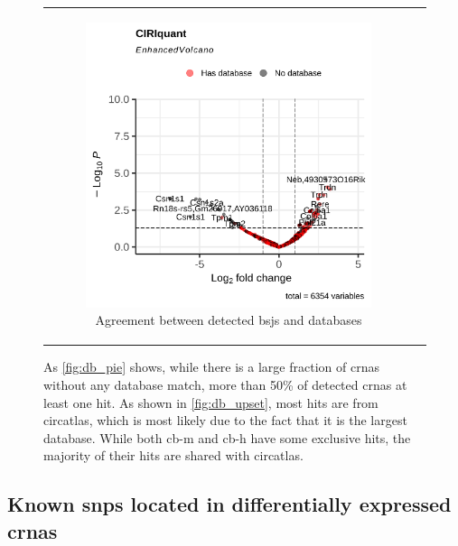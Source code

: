 \begin{figure}[ht]
\begin{tabular}{cc}
\begin{subfigure}{0.5\textwidth}
            \includegraphics[width=\linewidth]{chapters/4_results_and_discussion/figures/dea/ciriquant/letrozole/volcano.png}
            \caption{Agreement between detected
                \glspl{bsj} and databases}
            \label{fig:letrozole_volcano_ciriquant}
        \end{subfigure} &

    \end{tabular}
    \caption{As \cref{fig:db_pie} shows, while there is a large fraction of
        \glspl{crna} without any
        database match, more than 50\% of detected \glspl{crna} at least one
        hit.
        As shown in \cref{fig:db_upset}, most hits are from \gls{circatlas}, which is
        most likely due to the fact that it is the largest database.
        While both \gls{cb-m} and \gls{cb-h} have some exclusive hits, the majority of
        their hits are shared with \gls{circatlas}.
    }
    \label{fig:letrozole_volcano}
\end{figure}

\subsection{Known \glspl{snp} located in differentially expressed \glspl{crna}}
